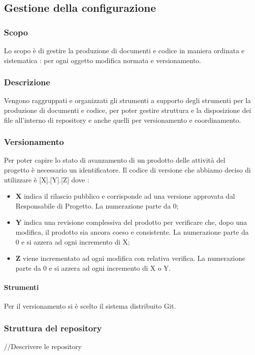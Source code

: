 \subsection{Gestione della configurazione}
\subsubsection{Scopo}
Lo scopo è di gestire la produzione di documenti e codice in maniera ordinata e sistematica : per ogni oggetto modifica normata e versionamento.

\subsubsection{Descrizione}
Vengono raggruppati e organizzati gli strumenti a supporto degli strumenti per la produzione di documenti e codice, per poter gestire struttura e la disposizione dei file all’interno di repository e anche quelli per versionamento e coordinamento.

\subsubsection{Versionamento}
Per poter capire lo stato di avanzamento di un prodotto delle attività del progetto è necessario un identificatore. Il codice di versione che abbiamo deciso di utilizzare è [X].[Y].[Z] dove :
\begin{itemize}
\item \textbf{X} indica il rilascio pubblico e corrisponde ad una versione approvata dal Responsabile di Progetto. La numerazione parte da 0;
\item \textbf{Y} indica una revisione complessiva del prodotto per verificare che, dopo una modifica, il prodotto sia ancora coeso e consistente. La numerazione parte da 0 e si azzera ad ogni incremento di X;
\item \textbf{Z} viene incrementato ad ogni modifica con relativa verifica. La numerazione parte da 0 e si azzera ad ogni incremento di X o Y.
\end{itemize}

\paragraph{Strumenti}
Per il versionamento si è scelto il sistema distribuito Git.

\subsubsection{Struttura del repository}
//Descrivere le repository
